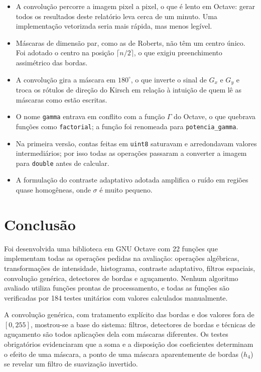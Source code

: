 \documentclass[11pt,a4paper]{article}
\begin{document}
\begin{itemize}
  \item A convolução percorre a imagem pixel a pixel, o que é lento em Octave: gerar todos os resultados deste relatório leva cerca de um minuto. Uma implementação vetorizada seria mais rápida, mas menos legível.
  \item Máscaras de dimensão par, como as de Roberts, não têm um centro único. Foi adotado o centro na posição $\lceil n/2\rceil$, o que exigiu preenchimento assimétrico das bordas.
  \item A convolução gira a máscara em $180^\circ$, o que inverte o sinal de $G_x$ e $G_y$ e troca os rótulos de direção do Kirsch em relação à intuição de quem lê as máscaras como estão escritas.
  \item O nome \texttt{gamma} entrava em conflito com a função $\Gamma$ do Octave, o que quebrava funções como \texttt{factorial}; a função foi renomeada para \texttt{potencia\_gamma}.
  \item Na primeira versão, contas feitas em \texttt{uint8} saturavam e arredondavam valores intermediários; por isso todas as operações passaram a converter a imagem para \texttt{double} antes de calcular.
  \item A formulação do contraste adaptativo adotada amplifica o ruído em regiões quase homogêneas, onde $\sigma$ é muito pequeno.
\end{itemize}

\section{Conclusão}

Foi desenvolvida uma biblioteca em GNU Octave com 22 funções que implementam todas as operações pedidas na avaliação: operações algébricas, transformações de intensidade, histograma, contraste adaptativo, filtros espaciais, convolução genérica, detectores de bordas e aguçamento. Nenhum algoritmo avaliado utiliza funções prontas de processamento, e todas as funções são verificadas por 184 testes unitários com valores calculados manualmente.

A convolução genérica, com tratamento explícito das bordas e dos valores fora de $[0,255]$, mostrou-se a base do sistema: filtros, detectores de bordas e técnicas de aguçamento são todos aplicações dela com máscaras diferentes. Os testes obrigatórios evidenciaram que a soma e a disposição dos coeficientes determinam o efeito de uma máscara, a ponto de uma máscara aparentemente de bordas ($h_4$) se revelar um filtro de suavização invertido.
\end{document}
